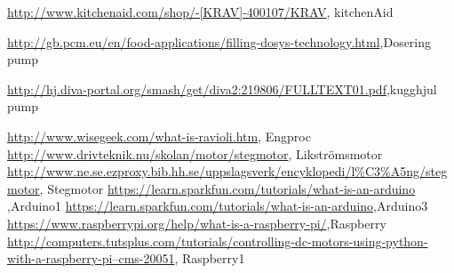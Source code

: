 \documentclass[11pt,a4paper,oneside]{book}
\begin{document}
\backmatter
 
\begin{thebibliography}{1}
\href{http://www.kitchenaid.com/shop/-[KRAV]-400107/KRAV/}{http://www.kitchenaid.com/shop/-[KRAV]-400107/KRAV}, kitchenAid	

\href{http://gb.pcm.eu/en/food-applications/filling-dosys-technology.html}{http://gb.pcm.eu/en/food-applications/filling-dosys-technology.html},Dosering pump

\href{http://hj.diva-portal.org/smash/get/diva2:219806/FULLTEXT01.pdf}{http://hj.diva-portal.org/smash/get/diva2:219806/FULLTEXT01.pdf},kugghjul pump

\href{http://www.wisegeek.com/what-is-ravioli.htm}{http://www.wisegeek.com/what-is-ravioli.htm}, Engproc
\href{http://www.drivteknik.nu/skolan/motor/stegmotor}{http://www.drivteknik.nu/skolan/motor/stegmotor}, Likströmsmotor
\href{http://www.ne.se.ezproxy.bib.hh.se/uppslagsverk/encyklopedi/l\%C3\%A5ng/stegmotor}{http://www.ne.se.ezproxy.bib.hh.se/uppslagsverk/encyklopedi/l\%C3\%A5ng/stegmotor}, Stegmotor
\href{https://learn.sparkfun.com/tutorials/what-is-an-arduino}{https://learn.sparkfun.com/tutorials/what-is-an-arduino },Arduino1
\href{https://learn.sparkfun.com/tutorials/what-is-an-arduino}{https://learn.sparkfun.com/tutorials/what-is-an-arduino},Arduino3
\href{https://www.raspberrypi.org/help/what-is-a-raspberry-pi/}{https://www.raspberrypi.org/help/what-is-a-raspberry-pi/},Raspberry
\href{http://computers.tutsplus.com/tutorials/controlling-dc-motors-using-python-with-a-raspberry-pi--cms-20051}{http://computers.tutsplus.com/tutorials/controlling-dc-motors-using-python-with-a-raspberry-pi--cms-20051}, Raspberry1





\end{thebibliography}
\end{document}
